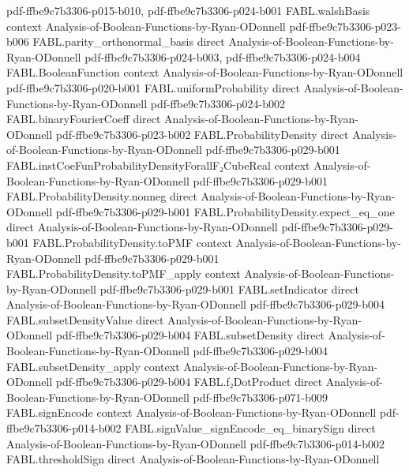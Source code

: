 \begin{theorem}
  {pdf-ffbe9c7b3306-p015-b010,
    pdf-ffbe9c7b3306-p024-b001}
\proofstep
  {FABL.walshBasis}
  {context}
  {Analysis-of-Boolean-Functions-by-Ryan-ODonnell}
  {pdf-ffbe9c7b3306-p023-b006}
\proofstep
  {FABL.parity_orthonormal_basis}
  {direct}
  {Analysis-of-Boolean-Functions-by-Ryan-ODonnell}
  {pdf-ffbe9c7b3306-p024-b003,
    pdf-ffbe9c7b3306-p024-b004}
\proofstep
  {FABL.BooleanFunction}
  {context}
  {Analysis-of-Boolean-Functions-by-Ryan-ODonnell}
  {pdf-ffbe9c7b3306-p020-b001}
\proofstep
  {FABL.uniformProbability}
  {direct}
  {Analysis-of-Boolean-Functions-by-Ryan-ODonnell}
  {pdf-ffbe9c7b3306-p024-b002}
\proofstep
  {FABL.binaryFourierCoeff}
  {direct}
  {Analysis-of-Boolean-Functions-by-Ryan-ODonnell}
  {pdf-ffbe9c7b3306-p023-b002}
\proofstep
  {FABL.ProbabilityDensity}
  {direct}
  {Analysis-of-Boolean-Functions-by-Ryan-ODonnell}
  {pdf-ffbe9c7b3306-p029-b001}
\proofstep
  {FABL.instCoeFunProbabilityDensityForallF₂CubeReal}
  {context}
  {Analysis-of-Boolean-Functions-by-Ryan-ODonnell}
  {pdf-ffbe9c7b3306-p029-b001}
\proofstep
  {FABL.ProbabilityDensity.nonneg}
  {direct}
  {Analysis-of-Boolean-Functions-by-Ryan-ODonnell}
  {pdf-ffbe9c7b3306-p029-b001}
\proofstep
  {FABL.ProbabilityDensity.expect_eq_one}
  {direct}
  {Analysis-of-Boolean-Functions-by-Ryan-ODonnell}
  {pdf-ffbe9c7b3306-p029-b001}
\proofstep
  {FABL.ProbabilityDensity.toPMF}
  {context}
  {Analysis-of-Boolean-Functions-by-Ryan-ODonnell}
  {pdf-ffbe9c7b3306-p029-b001}
\proofstep
  {FABL.ProbabilityDensity.toPMF_apply}
  {context}
  {Analysis-of-Boolean-Functions-by-Ryan-ODonnell}
  {pdf-ffbe9c7b3306-p029-b001}
\proofstep
  {FABL.setIndicator}
  {direct}
  {Analysis-of-Boolean-Functions-by-Ryan-ODonnell}
  {pdf-ffbe9c7b3306-p029-b004}
\proofstep
  {FABL.subsetDensityValue}
  {direct}
  {Analysis-of-Boolean-Functions-by-Ryan-ODonnell}
  {pdf-ffbe9c7b3306-p029-b004}
\proofstep
  {FABL.subsetDensity}
  {direct}
  {Analysis-of-Boolean-Functions-by-Ryan-ODonnell}
  {pdf-ffbe9c7b3306-p029-b004}
\proofstep
  {FABL.subsetDensity_apply}
  {context}
  {Analysis-of-Boolean-Functions-by-Ryan-ODonnell}
  {pdf-ffbe9c7b3306-p029-b004}
\proofstep
  {FABL.f₂DotProduct}
  {direct}
  {Analysis-of-Boolean-Functions-by-Ryan-ODonnell}
  {pdf-ffbe9c7b3306-p071-b009}
\proofstep
  {FABL.signEncode}
  {context}
  {Analysis-of-Boolean-Functions-by-Ryan-ODonnell}
  {pdf-ffbe9c7b3306-p014-b002}
\proofstep
  {FABL.signValue_signEncode_eq_binarySign}
  {direct}
  {Analysis-of-Boolean-Functions-by-Ryan-ODonnell}
  {pdf-ffbe9c7b3306-p014-b002}
\proofstep
  {FABL.thresholdSign}
  {direct}
  {Analysis-of-Boolean-Functions-by-Ryan-ODonnell}

\end{theorem}
